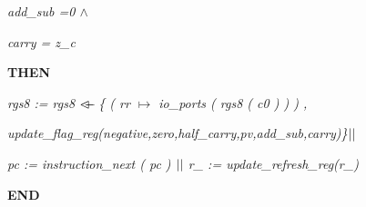 \documentclass[a4paper]{llncs}
\begin{document}
\hspace*{0.40in}\it add\_sub \rm =\hspace*{0.10in}\rm 0  $\land$ 

\hspace*{0.40in}\it carry \rm = \it z\_c

\hspace*{0.20in}\bf THEN

\hspace*{0.40in}\it rgs8 \rm := \it rgs8  $\lover$  \rm \{ \rm ( \it rr  $\mapsto$  \it io\_ports \rm ( \it rgs8 \rm ( \it c0 \rm ) \rm ) \rm ) \rm ,

\hspace*{0.40in}\it update\_flag\_reg\rm (\it negative\rm,\it zero\rm,\it half\_carry\rm,\it pv\rm,\it add\_sub\rm,\it carry)\rm\}$\mbox{$\mid\mid$}$

\hspace*{0.40in}\it pc \rm := \it instruction\_next \rm ( \it pc \rm )  $\mbox{$\mid\mid$}$  \it r\_ \rm := \it update\_refresh\_reg\rm (\it r\_\rm )

\hspace*{0.0in}\bf END \rm


\end{document}
